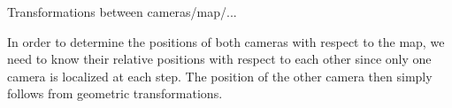Transformations between cameras/map/...

In order to determine the positions of both cameras with respect to the map, we need to know their relative positions with respect to each other since only one camera is localized at each step. The
position of the other camera then simply follows from geometric transformations.

